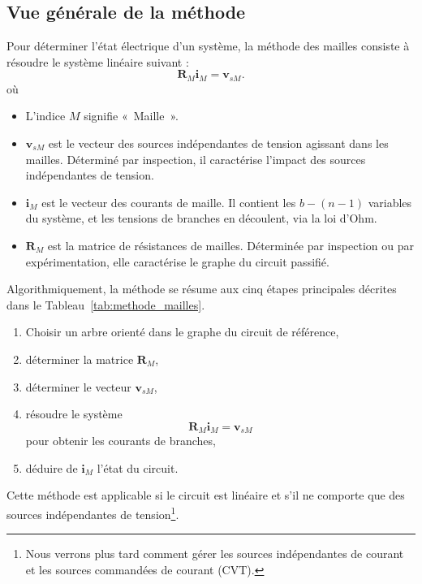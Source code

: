 \subsection{Vue générale de la méthode}
Pour déterminer l'état électrique d'un système, la méthode des mailles consiste à résoudre le système linéaire suivant : 
$$\mathbf{R}_M \mathbf{i}_M = \mathbf{v}_{sM}.$$
où 
\begin{itemize}
	\item L'indice $M$ signifie «~Maille~».
	\item $\mathbf{v}_{sM}$ est le vecteur des sources indépendantes de tension agissant dans les mailles. Déterminé par inspection, il caractérise l'impact des sources indépendantes de tension.
	\item $\mathbf{i}_M$ est le vecteur des courants de maille. Il contient les $b-(n-1)$ variables du système, et les tensions de branches en découlent, via la loi d'Ohm.
	\item $\mathbf{R}_M$ est la matrice de résistances de mailles. Déterminée par inspection ou par expérimentation, elle caractérise le graphe du circuit passifié.
\end{itemize}

Algorithmiquement, la méthode se résume aux cinq étapes principales décrites dans le Tableau~\ref{tab:methode_mailles}.
\begin{table}[tb]
	\caption{Vue algorithmique de la méthode des mailles. \label{tab:methode_mailles}}
	\begin{boxedminipage}{\textwidth}
		\begin{enumerate}
			\item Choisir un arbre orienté dans le graphe du circuit de référence,
			\item déterminer la matrice $\mathbf{R}_M$,
			\item déterminer le vecteur $\mathbf{v}_{sM}$,
			\item résoudre le système $$\mathbf{R}_M \mathbf{i}_M = \mathbf{v}_{sM}$$ pour obtenir les courants de branches,
			\item déduire de $\mathbf{i}_M$ l'état du circuit.
		\end{enumerate}
	\end{boxedminipage}
\end{table}
Cette méthode est applicable si le circuit est linéaire et s'il ne comporte que des sources indépendantes de tension\footnote{ Nous verrons plus tard comment gérer les sources indépendantes de courant et les sources commandées de courant (CVT).}.

